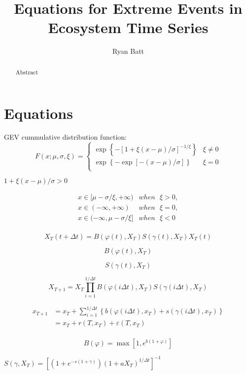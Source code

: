 \documentclass{article}
\title{Equations for Extreme Events in Ecosystem Time Series}
\author{Ryan Batt}
\begin{document}
\maketitle

\begin{abstract}
    Abstract
\end{abstract}

\section{Equations}

GEV cummulative distribution function:  
\[F\left( x;\mu ,\sigma ,\xi  \right)=\left\{ \begin{matrix}
   \exp \left\{ -{{[1+\xi (x-\mu )/\sigma ]}^{-1/\xi }} \right\} & \xi \ne 0  \\
   \exp \left\{ -\exp \left[ -(x-\mu )/\sigma  \right] \right\} & \xi =0  \\
\end{matrix} \right.\]

$1+\xi (x-\mu )/\sigma >0$

\[\begin{array}{*{35}{l}}
   x\in [\mu -\sigma /\xi ,+\infty ) & when\text{ }\xi >0,  \\
   x\in (-\infty ,+\infty ) & when\text{ }\xi =0,  \\
   x\in (-\infty ,\mu -\sigma /\xi ] & when\text{ }\xi <0  \\
\end{array}\]

\[{{X}_{T}}\left( t+\Delta t \right)=B\left( \varphi \left( t \right),{{X}_{T}} \right)S\left( \gamma \left( t \right),{{X}_{T}} \right){{X}_{T}}\left( t \right)\]

\[B\left( \varphi \left( t \right),{{X}_{T}} \right)\]

\[S\left( \gamma \left( t \right),{{X}_{T}} \right)\]

\[{{X}_{T+1}}={{X}_{T}}\prod\limits_{i=1}^{1/\Delta t}{B\left( \varphi \left( i\Delta t \right),{{X}_{T}} \right)S\left( \gamma \left( i\Delta t \right),{{X}_{T}} \right)}\]

\[\begin{array}{*{35}{l}}
   {{x}_{T+1}} & ={{x}_{T}}+\sum\limits_{i=1}^{1/\Delta t}{\left\{ b\left( \varphi \left( i\Delta t \right),{{x}_{T}} \right)+s\left( \gamma \left( i\Delta t \right),{{x}_{T}} \right) \right\}}  \\
   {} & ={{x}_{T}}+r\left( T,{{x}_{T}} \right)+\varepsilon \left( T,{{x}_{T}} \right)  \\
\end{array}\]

\[B\left( \varphi  \right)=\max \left[ 1,{{e}^{b\left( 1+\varphi  \right)}} \right]\]

$S\left( \gamma ,{{X}_{T}} \right)={{\left[ \left( 1+{{e}^{-s\left( 1+\gamma  \right)}} \right){{\left( 1+a{{X}_{T}} \right)}^{1/\Delta t}} \right]}^{-1}}$
\end{document}
